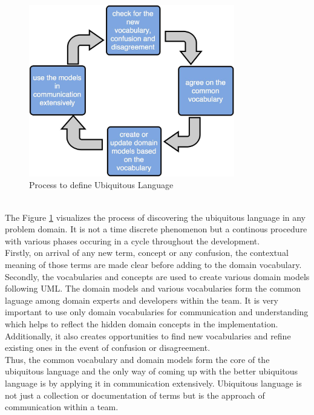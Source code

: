 \begin{figure}[H]
\begin{center}
\includegraphics[width=0.8\textwidth]{figures/domain-driven-design-one}
\caption{Process to define Ubiquitous Language \cite{Evans:2003aa}}
\label{fig:domain_driven_design/ubiquitous_language_process}
\end{center}
\end{figure}
\\
The Figure \ref{fig:domain_driven_design/ubiquitous_language_process} visualizes the process of discovering the ubiquitous language in any problem domain. It is not a time discrete phenomenon but a continous procedure with various phases occuring in a cycle throughout the development.
\\
Firstly, on arrival of any new term, concept or any confusion, the contextual meaning of those terms are made clear before adding to the domain vocabulary. Secondly, the vocabularies and concepts are used to create various domain models following \acrshort{UML}. The domain models and various vocabularies form the common laguage among domain experts and developers within the team. It is very important to use only domain vocabularies for communication and understanding which helps to reflect the hidden domain concepts in the implementation. Additionally, it also creates opportunities to find new vocabularies and refine existing ones in the event of confusion or disagreement. \cite{Evans:2003aa}
\\
Thus, the common vocabulary and domain models form the core of the ubiquitous language and the only way of coming up with the better ubiquitous language is by applying it in communication extensively. Ubiquitous language is not just a collection or documentation of terms but is the approach of communication within a team.
\\

